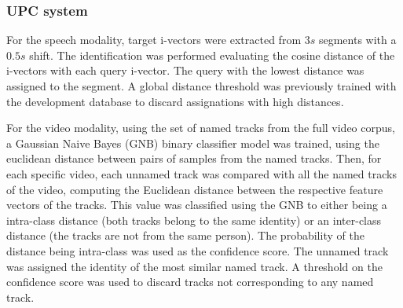 \subsubsection{UPC system}

For the speech modality, target i-vectors were extracted from $3s$ segments with a $0.5s$ shift. The identification was performed evaluating the cosine distance of the i-vectors with each query i-vector. The query with the lowest distance was assigned to the segment. A global distance threshold was previously trained with the development database to discard assignations with high distances.

For the video modality, using the set of named tracks from the full video corpus, a Gaussian Naive Bayes (GNB) binary classifier model was trained, using the euclidean distance between pairs of samples from the named tracks. Then, for each specific video, each unnamed track was compared with all the named tracks of the video, computing the Euclidean distance between the respective feature vectors of the tracks. This value was classified using the GNB to either being a intra-class distance (both tracks belong to the same identity) or an inter-class distance (the tracks are not from the same person). The probability of the distance being intra-class was used as the confidence score. The unnamed track was assigned the identity of the most similar named track. A threshold on the confidence score was used to discard tracks not corresponding to any named track.

\endinput







The proposed system can be divided in an enrolment and a search stage. For each person name detected by optical character recognition (OCR), the most likely interval
of speech and face presence are detected and used for enrolment.
Once the detected people are enrolled, speaker and face recognition
are performed for each shot in order to assign labels to that shot. 
A decision fusion strategy is implemented in order to combine the speech and video labels (Fig.~\ref{fig:vbn}). The details of the system
are described below.

\begin{figure}[!htb]
 \centering
 \texttt{[image: VBN.png]}
\vspace*{-5mm}
 \caption{Verification-based naming process. Light blue boxes are when names are combined with face tracks and speech turns to create  models.}
\vspace*{-5mm}
 \label{fig:vbn}
\end{figure}

